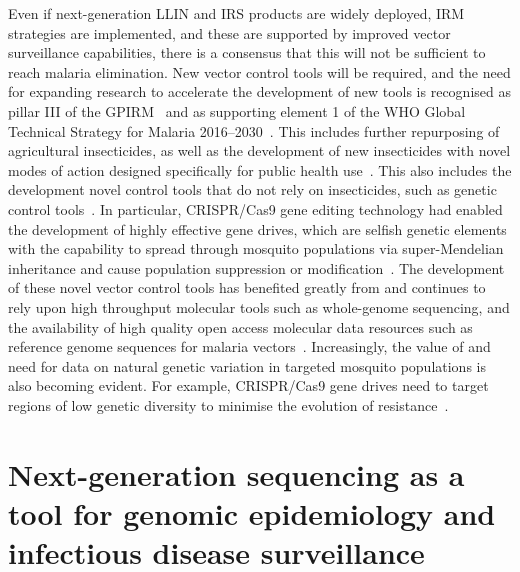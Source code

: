 \begin{refsection}
 
Even if next-generation LLIN and IRS products are widely deployed, IRM strategies are implemented, and these are supported by improved vector surveillance capabilities, there is a consensus that this will not be sufficient to reach malaria elimination.
%
New vector control tools will be required, and the need for expanding research to accelerate the development of new tools is recognised as pillar \RN{3} of the GPIRM~\parencite{WHO2012GPIRM} and as supporting element 1 of the WHO Global Technical Strategy for Malaria 2016--2030~\parencite{WHO2015GTS}.
%
This includes further repurposing of agricultural insecticides, as well as the development of new insecticides with novel modes of action designed specifically for public health use~\parencite{Hemingway2006,Lees2019}.
%
This also includes the development novel control tools that do not rely on insecticides, such as genetic control tools~\parencite{Davidson1974,Burt2003}.
%
In particular, CRISPR/Cas9 gene editing technology had enabled the development of highly effective gene drives, which are selfish genetic elements with the capability to spread through mosquito populations via super-Mendelian inheritance and cause population suppression or modification~\parencite{Burt2003,Kyrou2018}.
%
The development of these novel vector control tools has benefited greatly from and continues to rely upon high throughput molecular tools such as whole-genome sequencing, and the availability of high quality open access molecular data resources such as reference genome sequences for malaria vectors~\parencite{Holt2002,Sharakhova2007,Lawniczak2010,Neafsey2015}.
%
Increasingly, the value of and need for data on natural genetic variation in targeted mosquito populations is also becoming evident.
%
For example, CRISPR/Cas9 gene drives need to target regions of low genetic diversity to minimise the evolution of resistance~\parencite{Kyrou2018}.


\section[Next-generation sequencing]{Next-generation sequencing as a tool for genomic epidemiology and infectious disease surveillance}\label{sec:NGS}



\end{refsection}
